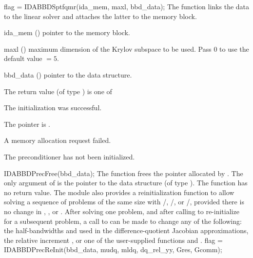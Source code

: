 {}
{
  flag = IDABBDSptfqmr(ida\_mem, maxl, bbd\_data);
}
{
  The function  links the {\idabbdpre} data to the
  {\idasptfqmr} linear solver and attaches the latter to the {\ida}
  memory block.
}
{
  \begin{args}
  \item[ida\_mem] ()
    pointer to the {\ida} memory block.
  \item[maxl] ()
    maximum dimension of the Krylov subspace to be used. Pass $0$ to use the 
    default value $=5$.
  \item[bbd\_data] ()
    pointer to the {\idabbdpre} data structure.
  \end{args}
}
{
  The return value  (of type ) is one of
  \begin{args}
  \item[\Id{IDASPTFQMR\_SUCCESS}] 
    The {\idasptfqmr} initialization was successful.
  \item[\Id{IDASPTFQMR\_MEM\_NULL}]
    The  pointer is .
  \item[\Id{IDASPTFQMR\_MEM\_FAIL}]
    A memory allocation request failed.
  \item[\Id{IDA\_PDATA\_NULL}]
    The {\idabbdpre} preconditioner has not been initialized.
  \end{args}
}
{}
{
  IDABBDPrecFree(bbd\_data);
}
{
  The function  frees the pointer allocated by
  .
}
{
  The only argument of  is the pointer to the {\idabbdpre} 
  data structure (of type ).
}
{
  The function  has no return value.
}
{}
The {\idabbdpre} module also provides a reinitialization function to allow
solving  a sequence of problems of the same size with {\idaspgmr}/{\idabbdpre},
{\idaspbcg}/{\idabbdpre}, or {\idasptfqmr}/{\idabbdpre}, provided there is no
change in , , or .
After solving one problem, and after calling  to re-initialize 
{\ida} for a subsequent problem, a call to  can be made
to change any of the following: the half-bandwidths  and  
used in the difference-quotient Jacobian approximations, the relative increment 
, or one of the user-supplied functions  and .
{
  flag = IDABBDPrecReInit(bbd\_data, mudq, mldq, dq\_rel\_yy, Gres, Gcomm);
}
